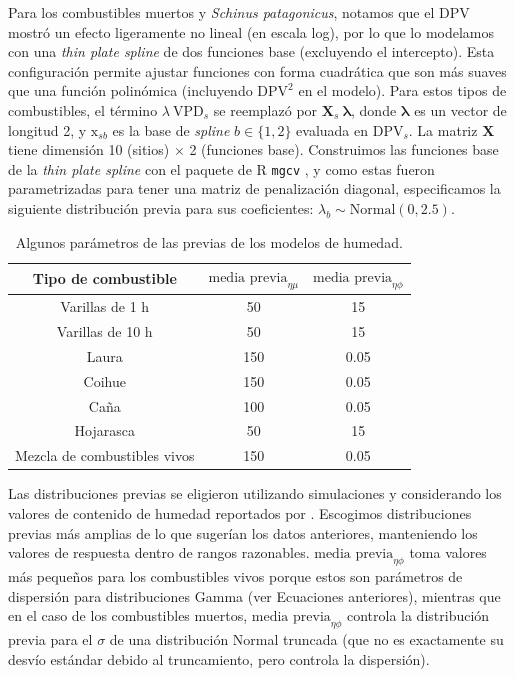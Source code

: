 Para los combustibles muertos y \textit{Schinus patagonicus}, notamos que el DPV mostró un efecto ligeramente no lineal (en escala log), por lo que lo modelamos con una \textit{thin plate spline} de dos funciones base (excluyendo el intercepto). Esta configuración permite ajustar funciones con forma cuadrática que son más suaves que una función polinómica (incluyendo $\text{DPV}^2$ en el modelo). Para estos tipos de combustibles, el término $\lambda \ \text{VPD}_s$ se reemplazó por $\textbf{X}_s \ \boldsymbol{\lambda}$, donde $\boldsymbol{\lambda}$ es un vector de longitud 2, y $\text{x}_{sb}$ es la base de \textit{spline} $b \in \{1, 2\}$ evaluada en $\text{DPV}_s$. La matriz $\textbf{X}$ tiene dimensión 10 (sitios) $\times$ 2 (funciones base). Construimos las funciones base de la \textit{thin plate spline} con el paquete de R \texttt{mgcv} \citep{wood_generalized_2017}, y como estas fueron parametrizadas para tener una matriz de penalización diagonal, especificamos la siguiente distribución previa para sus coeficientes: $\lambda_b \sim \text{Normal}(0, 2.5)$.

\begin{table}
\begin{center}
\caption[Previas de los modelos de humedad.]{Algunos parámetros de las previas de los modelos de humedad.}
\label{tab:cap2-S02}
\begin{tabular}{c c c} 
 \hline
 Tipo de combustible & $\text{media previa}_{\eta \mu}$ & $\text{media previa}_{\eta \phi}$ \\ [0.5ex] 
 \hline
 Varillas de 1 h & 50 & 15 \\
 Varillas de 10 h & 50 & 15 \\
 Laura & 150 & 0.05 \\
 Coihue & 150 & 0.05 \\
 Caña & 100 & 0.05 \\
 Hojarasca & 50 & 15 \\
 Mezcla de combustibles vivos & 150 & 0.05 \\ [1ex] 
 \hline
\end{tabular}
\end{center}
\end{table}

Las distribuciones previas se eligieron utilizando simulaciones y considerando los valores de contenido de humedad reportados por \citet{bianchi_ignition_2014, bianchi_comparison_2018, blackhall_is_2012, blackhall_flammability_2019}. Escogimos distribuciones previas más amplias de lo que sugerían los datos anteriores, manteniendo los valores de respuesta dentro de rangos razonables. $\text{media previa}_{\eta \phi}$ toma valores más pequeños para los combustibles vivos porque estos son parámetros de dispersión para distribuciones Gamma (ver Ecuaciones anteriores), mientras que en el caso de los combustibles muertos, $\text{media previa}_{\eta \phi}$ controla la distribución previa para el $\sigma$ de una distribución Normal truncada (que no es exactamente su desvío estándar debido al truncamiento, pero controla la dispersión).

